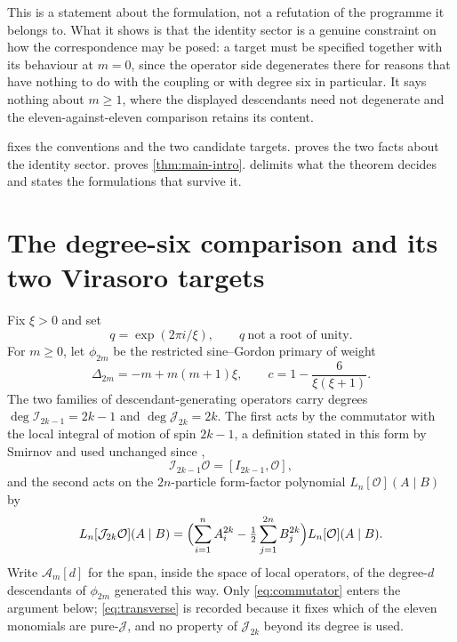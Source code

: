 \documentclass[11pt,reqno]{amsart}
\theoremstyle{plain}
\theoremstyle{definition}
\theoremstyle{remark}
\numberwithin{equation}{section}
\newcommand{\Aop}{\mathcal A}
\newcommand{\Iop}{\mathcal I}
\newcommand{\Jop}{\mathcal J}
\begin{document}
This is a statement about the formulation, not a refutation of the programme
it belongs to. What it shows is that the identity sector is a genuine
constraint on how the correspondence may be posed: a target must be specified
together with its behaviour at $m=0$, since the operator side degenerates
there for reasons that have nothing to do with the coupling or with degree
six in particular. It says nothing about $m\ge1$, where the displayed
descendants need not degenerate and the eleven-against-eleven comparison
retains its content.

 fixes the conventions and the two candidate targets.
 proves the two facts about the identity sector.
 proves \cref{thm:main-intro}.  delimits
what the theorem decides and states the formulations that survive it.

\section{The degree-six comparison and its two Virasoro targets}
\label{sec:formulation}

Fix $\xi>0$ and set
\begin{equation}
  q=\exp(2\pi i/\xi),
  \qquad q\ \text{not a root of unity}.
  \label{eq:q}
\end{equation}
For $m\ge0$, let $\phi_{2m}$ be the restricted sine--Gordon primary of weight
\begin{equation}
  \Delta_{2m}=-m+m(m+1)\xi,
  \qquad
  c=1-\frac{6}{\xi(\xi+1)}.
  \label{eq:weights}
\end{equation}
The two families of descendant-generating operators carry degrees
$\deg\Iop_{2k-1}=2k-1$ and $\deg\Jop_{2k}=2k$. The first acts by the
commutator with the local integral of motion of spin $2k-1$, a definition
stated in this form by Smirnov and used unchanged since
\cite{Smirnov_1998so,Jimbo_2011fs},
\begin{equation}
  \Iop_{2k-1}\mathcal O=[I_{2k-1},\mathcal O],
  \label{eq:commutator}
\end{equation}
and the second acts on the $2n$-particle form-factor polynomial
$L_n[\mathcal O](A\mid B)$ by
\begin{equation}
 L_n[\Jop_{2k}\mathcal O](A\mid B)
 =\Bigl(\sum_{i=1}^{n}A_i^{2k}-\tfrac12\sum_{j=1}^{2n}B_j^{2k}\Bigr)
 L_n[\mathcal O](A\mid B).
 \label{eq:transverse}
\end{equation}
Write $\Aop_m[d]$ for the span, inside the space of local operators, of the
degree-$d$ descendants of $\phi_{2m}$ generated this way. Only
\eqref{eq:commutator} enters the argument below; \eqref{eq:transverse} is
recorded because it fixes which of the eleven monomials are pure-$\Jop$, and
no property of $\Jop_{2k}$ beyond its degree is used.
\end{document}
